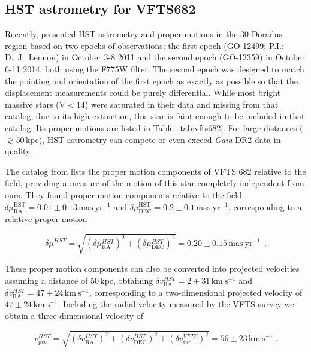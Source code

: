 \documentclass[a4paper,fleqn,usenatbib]{mnras}
\newcommand{\kms}{{\,\mathrm{km\ s^{-1}}}}
\DeclareRobustCommand{\Tabref}[1]{Table~\ref{#1}}
\begin{document}
\subsection{HST astrometry for VFTS682}
Recently, \citet{platais:18} presented HST  astrometry and proper
motions in the 30 Doradus region based on two epochs of
observations; the first epoch (GO-12499; P.I.: D.~J.~Lennon)
in October 3-8 2011 and the second epoch (GO-13359) in
October 6-11 2014, both using the F775W filter.
The second epoch was designed to match the pointing and
orientation of the first epoch as exactly as possible so
that the displacement measurements could be purely differential.
While most bright massive stars (V$<$14) were saturated in
their data and missing from that catalog, due to its
high extinction, this star is faint enough
to be included in that catalog. Its proper motions are
listed in \Tabref{tab:vfts682}. For
large distances ($\gtrsim50$\,kpc), HST astrometry can compete or even
exceed \emph{Gaia} DR2 data in quality.

The catalog from \citet{platais:18} lists the proper motion
components of VFTS 682 relative to the field, providing a
measure of the motion of this star completely independent from
ours. They found proper
motion components relative to the field
$\delta\mu_\mathrm{RA}^\mathrm{HST} = 0.01\pm0.13\,\mathrm{mas\
  yr^{-1}}$ and
$\delta\mu_\mathrm{DEC}^\mathrm{HST}=0.2\pm0.1\,\mathrm{mas\
  yr^{-1}}$, corresponding to a relative proper motion 

\begin{equation}
  \label{eq:pm_around_HST}
  \delta \mu^{HST} = \sqrt{\left(\delta\mu_\mathrm{RA}^{HST}\right)^2+\left(\delta\mu_\mathrm{DEC}^{HST}\right)^2}
  = 0.20 \pm 0.15\,\mathrm{mas\
  yr^{-1}} \ \ .
\end{equation}

These proper motion components can also be converted into projected
velocities assuming a distance of 50\,kpc, obtaining $\delta
v_\mathrm{RA}^{HST}=2\pm31\kms$ and $\delta
v_\mathrm{RA}^{HST}=47\pm24\kms$, corresponding to a two-dimensional
projected velocity of $47\pm24\kms$. Including the radial velocity
measured by the VFTS survey we obtain a three-dimensional velocity of

\begin{equation}
  \label{eq:speed_around_HST}
  v_\mathrm{pec}^{HST} = \sqrt{\left(\delta v_\mathrm{RA}^{HST}\right)^2
    +\left(\delta v_\mathrm{DEC}^{HST}\right)^2+\left(\delta
      v_\mathrm{rad}^{VFTS}\right)^2} = 56 \pm 23
  \kms \ .
\end{equation}
\end{document}
